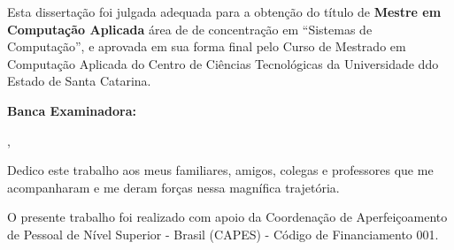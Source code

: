 % 
\begin{folhadeaprovacao}

	\begin{center}
		{\ABNTEXchapterfont\bfseries\imprimirautor}
		\vspace{6em}

			\ABNTEXchapterfont\bfseries\imprimirtitulo
		
	\end{center}
		\vspace{1em}
		{\justify
		Esta dissertação foi julgada adequada para a obtenção do título de
    	{\ABNTEXchapterfont\bfseries Mestre em Computação Aplicada}   
   		área de de concentração em ``Sistemas de Computação'',
   		 e aprovada em sua forma final pelo Curso de Mestrado em Computação Aplicada do Centro
   		 de Ciências Tecnológicas da Universidade ddo Estado de Santa Catarina.}
	
	\vspace{3em} 
	\noindent
	{\bfseries Banca Examinadora:}

    \vspace*{\fill}
    \begin{center}
    	\imprimirlocal,\,\imprimirfulldata
    \end{center}
\end{folhadeaprovacao}

\begin{dedicatoria}				
Dedico este trabalho aos meus familiares, amigos, colegas e professores que me acompanharam e me deram forças nessa magnífica trajetória.  
\end{dedicatoria}

\begin{agradecimentos}

O presente trabalho foi realizado com apoio da Coordenação de Aperfeiçoamento de Pessoal de Nível Superior - Brasil (CAPES) - Código de Financiamento 001.

\end{agradecimentos}

